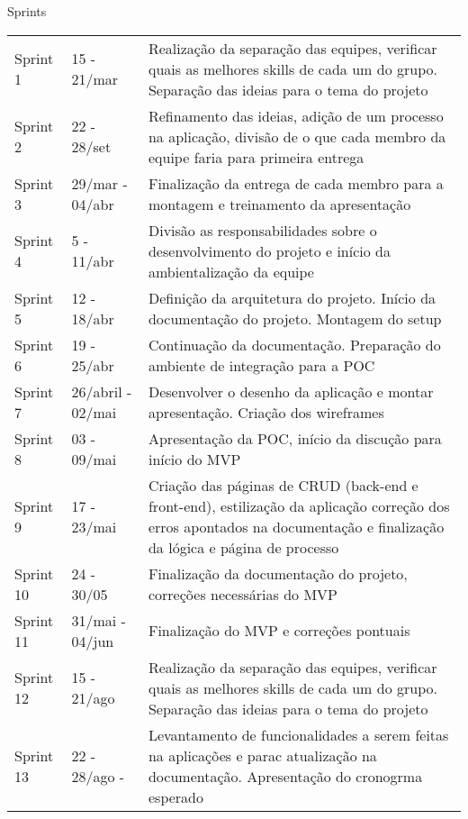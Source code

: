 \begin{quadro}[htb]
	\centering
	\ABNTEXfontereduzida
	\caption[Sprints]{Sprints}
	\label{quadro-atividades}
	\begin{tabular}{|p{1.5cm}|p{3.0cm}|p{10.0cm}|}
		\hline
		\thead{Sprints} & \thead{Período}  & \thead{Atividades} \\
		\hline
		Sprint 1 & 15 - 21/mar  & Realização da separação das equipes, verificar quais as melhores skills de cada um do grupo. Separação das ideias para o tema do projeto   \\
		\hline
		Sprint 2 & 22 - 28/set & Refinamento das ideias, adição de um processo na aplicação, divisão de o que cada membro da equipe faria para primeira entrega \\
		\hline
		Sprint 3 & 29/mar - 04/abr  & Finalização da entrega de cada membro para a montagem e treinamento da apresentação \\
		\hline
		Sprint 4 & 5 - 11/abr & Divisão as responsabilidades sobre o desenvolvimento do projeto e início da ambientalização da equipe \\
		\hline
		Sprint 5 & 12 - 18/abr & Definição da arquitetura do projeto. Início da documentação do projeto. Montagem do setup  \\
		\hline
		Sprint 6 & 19 - 25/abr & Continuação da documentação. Preparação do ambiente de integração para a POC \\
		\hline
		Sprint 7 & 26/abril - 02/mai & Desenvolver o desenho da aplicação e montar apresentação. Criação dos wireframes  \\
		\hline
		Sprint 8 & 03 - 09/mai  & Apresentação da POC, início da discução para início do MVP \\
		\hline
		Sprint 9 & 17 - 23/mai  & Criação das páginas de CRUD (back-end e front-end), estilização da aplicação correção dos erros apontados na documentação e finalização da lógica e página de processo  \\
		\hline
		Sprint 10 & 24 - 30/05 & Finalização da documentação do projeto, correções necessárias do MVP \\
		\hline
		Sprint 11 & 31/mai - 04/jun & Finalização do MVP e correções pontuais\\
		\hline
		Sprint 12 & 15 - 21/ago  & Realização da separação das equipes, verificar quais as melhores skills de cada um do grupo. Separação das ideias para o tema do projeto   \\
		\hline
		Sprint 13 & 22 - 28/ago -  & Levantamento de funcionalidades a serem feitas na aplicações e parac atualização na documentação. Apresentação do cronogrma esperado \\

\end{tabular}
\end{quadro}

